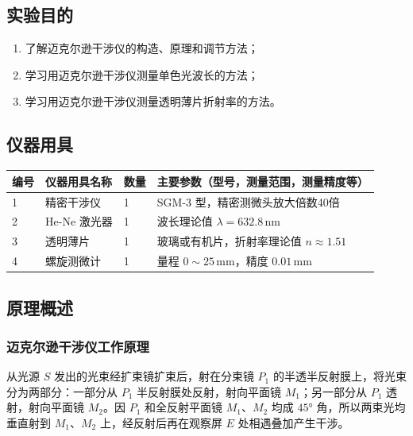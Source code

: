 \documentclass[dvipsnames, svgnames,a4paper,11pt]{article}
\begin{document}
\clearpage

\setcounter{section}{0}
	
\subsection{实验目的}
\begin{enumerate}
	\item 了解迈克尔逊干涉仪的构造、原理和调节方法；
	\item 学习用迈克尔逊干涉仪测量单色光波长的方法；
	\item 学习用迈克尔逊干涉仪测量透明薄片折射率的方法。
\end{enumerate}

\subsection{仪器用具}
\begin{table}[htbp]
	\centering
	\renewcommand\arraystretch{1.6}
	\begin{tabular}{p{}|p{}|p{}|p{}}
	\hline
	编号& 仪器用具名称 & 数量 &  主要参数（型号，测量范围，测量精度等） \\
	\hline
	1 & 精密干涉仪 & 1 & SGM-3 型，精密测微头放大倍数40倍 \\
	2 & He-Ne 激光器 & 1 & 波长理论值 $\lambda = 632.8\,\mathrm{nm}$ \\
	3 & 透明薄片 & 1 & 玻璃或有机片，折射率理论值 $n \approx 1.51$ \\
	4 & 螺旋测微计 & 1 & 量程 $0\sim25\,\mathrm{mm}$，精度 $0.01\,\mathrm{mm}$ \\
	\hline
\end{tabular}
\end{table}

\subsection{原理概述}

\subsubsection{迈克尔逊干涉仪工作原理}

从光源 $S$ 发出的光束经扩束镜扩束后，射在分束镜 $P_1$ 的半透半反射膜上，将光束分为两部分：一部分从 $P_1$ 半反射膜处反射，射向平面镜 $M_1$；另一部分从 $P_1$ 透射，射向平面镜 $M_2$。因 $P_1$ 和全反射平面镜 $M_1$、$M_2$ 均成 $45°$ 角，所以两束光均垂直射到 $M_1$、$M_2$ 上，经反射后再在观察屏 $E$ 处相遇叠加产生干涉。
\end{document}
